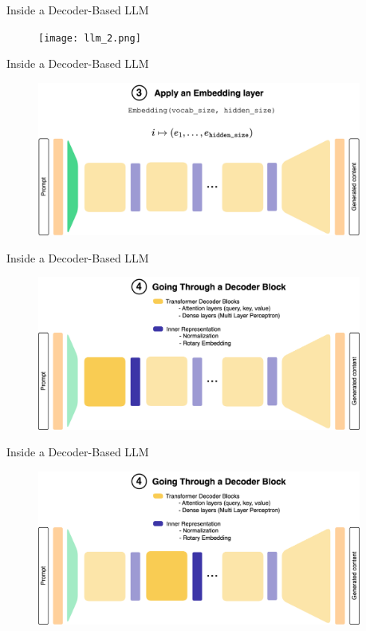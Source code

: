 \documentclass[11pt,aspectratio=169]{beamer}
\begin{document}
\begin{frame}{Inside a Decoder-Based LLM}
    \begin{figure}
        \centering
        \texttt{[image: llm\_2.png]}
    \end{figure}
\end{frame}

\begin{frame}{Inside a Decoder-Based LLM}
    \begin{figure}
        \centering
        \includegraphics[width=0.95\textwidth]{llm_3.png}
    \end{figure}
\end{frame}

\begin{frame}{Inside a Decoder-Based LLM}
    \begin{figure}
        \centering
        \includegraphics[width=0.95\textwidth]{llm_4.png}
    \end{figure}
\end{frame}

\begin{frame}{Inside a Decoder-Based LLM}
    \begin{figure}
        \centering
        \includegraphics[width=0.95\textwidth]{llm_5.png}
    \end{figure}
\end{frame}
\end{document}
